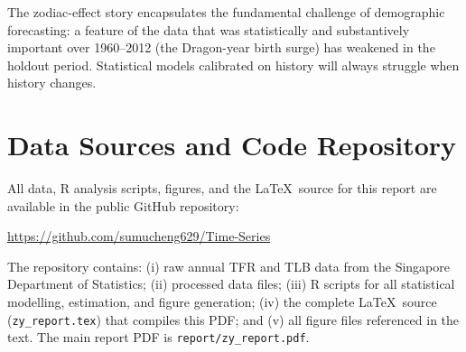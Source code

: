 \documentclass[12pt,a4paper]{article}
\begin{document}
The zodiac-effect story encapsulates the fundamental challenge of demographic
forecasting: a feature of the data that was statistically and substantively important
over 1960--2012 (the Dragon-year birth surge) has weakened in the holdout period.
Statistical models calibrated on history will always struggle when history changes.

\clearpage
\appendix
\section{Data Sources and Code Repository}
\label{app:repo}

All data, R analysis scripts, figures, and the \LaTeX\ source for this report
are available in the public GitHub repository:

\begin{center}
\url{https://github.com/sumucheng629/Time-Series}
\end{center}

The repository contains: (i) raw annual TFR and TLB data from the Singapore
Department of Statistics; (ii) processed data files; (iii) R scripts for all statistical modelling, estimation, and figure generation; (iv) the complete \LaTeX\ source
(\texttt{zy\_report.tex}) that compiles this PDF; and (v) all figure files
referenced in the text. The main report PDF is \texttt{report/zy\_report.pdf}.
\end{document}

